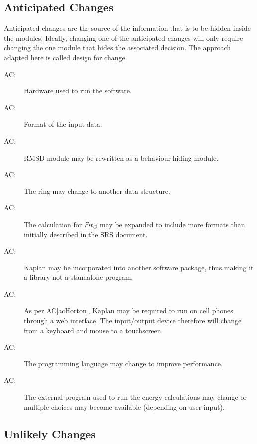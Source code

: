 \documentclass[12pt, titlepage]{article}
\newcounter{acnum}
\newcommand{\actheacnum}{AC\theacnum}
\newcommand{\progname}{Kaplan} %
\begin{document}
\subsection{Anticipated Changes} \label{SecAchange}

Anticipated changes are the source of the information that is to be hidden
inside the modules. Ideally, changing one of the anticipated changes will only
require changing the one module that hides the associated decision. The approach
adapted here is called design for
change.

\begin{description}
\item[ \actheacnum \label{acHardware}:] Hardware used to 
run the software.
\item[ \actheacnum \label{acInput}:] Format of the input 
data.
\item[ \actheacnum \label{acRMSD}:] RMSD module may be 
rewritten as a behaviour hiding module.
\item[ \actheacnum \label{acRing}:] The ring may change 
to another data structure.
\item[ \actheacnum \label{acFit_G}:] The calculation for 
$Fit_G$ may be expanded to include more formats than initially described in the 
SRS document.
\item[ \actheacnum \label{acHorton}:] \progname{} may be 
incorporated into another software package, thus making it a library not a 
standalone program.
\item[ \actheacnum \label{acOutputDevice}:] As per 
AC\ref{acHorton}, \progname{} may be required to run on cell phones through a 
web 
interface. The input/output device therefore will change from a keyboard and 
mouse to a touchscreen.
\item[ \actheacnum \label{acProgLang}:] The programming 
language may change to improve performance.
\item[ \actheacnum \label{acEnergy}:] The external 
program used to run the energy calculations may change or multiple choices may 
become available (depending on user input).
\end{description}

\subsection{Unlikely Changes} \label{SecUchange}
\end{document}
